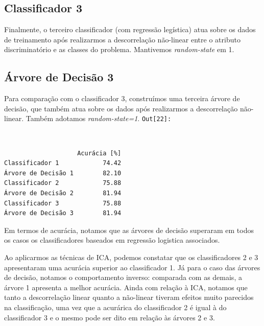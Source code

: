 \documentclass[11pt]{article}
\begin{document}
    \subsection{Classificador 3}\label{classificador-3}

Finalmente, o terceiro classificador (com regressão legística) atua
sobre os dados de treinamento após realizarmos a descorrelação
não-linear entre o atributo discriminatório e as classes do problema.
Mantivemos \emph{random-state} em 1.

    \subsection{Árvore de Decisão 3}\label{uxe1rvore-de-decisuxe3o-3}

Para comparação com o classificador 3, construímos uma terceira árvore
de decisão, que também atua sobre os dados após realizarmos a
descorrelação não-linear. Também adotamos \emph{random-state=1}.
\texttt{\color{outcolor}Out[{\color{outcolor}22}]:}
    
    \begin{center}
    \end{center}
    { \hspace*{\fill} \\}
    

    
    \begin{verbatim}
                    Acurácia [%]
Classificador 1            74.42
Árvore de Decisão 1        82.10
Classificador 2            75.88
Árvore de Decisão 2        81.94
Classificador 3            75.88
Árvore de Decisão 3        81.94
    \end{verbatim}

    
    Em termos de acurácia, notamos que as árvores de decisão superaram em
todos os casos os classificadores baseados em regressão logistica
associados.

Ao aplicarmos as técnicas de ICA, podemos constatar que os
classificadores 2 e 3 apresentaram uma acurácia superior ao
classificador 1. Já para o caso das árvores de decisão, notamos o
comportamento inverso: comparada com as demais, a árvore 1 apresenta a
melhor acurácia. Ainda com relação à ICA, notamos que tanto a
descorrelação linear quanto a não-linear tiveram efeitos muito parecidos
na classificação, uma vez que a acurárica do classificador 2 é igual à
do classificador 3 e o mesmo pode ser dito em relação às árvores 2 e 3.
\end{document}
